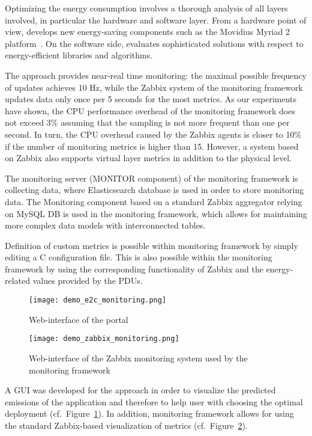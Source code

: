 \documentclass[10pt,letterpaper]{IEEEtran}
\begin{document}
Optimizing the energy consumption involves a thorough analysis of all layers involved, in particular the
hardware and software layer. From a hardware point of view, \EXCESS develops new energy-saving components
such as the Movidius Myriad 2 platform~\cite{movidius14}. On the software side, \EXCESS evaluates sophisticated solutions with respect to
energy-efficient libraries and algorithms. 

The \EXCESS approach provides near-real time monitoring: the maximal possible frequency of updates achieves 10 Hz,
while the Zabbix system of the \ECO monitoring framework updates data only once per 5 seconds for the most metrics.
As our experiments have shown, the CPU performance overhead of the \EXCESS monitoring framework does not
exceed 3\% assuming that the sampling is not more frequent than one per second.
In turn, the CPU overhead caused by the \ECO Zabbix agents is closer to 10\% if the number of monitoring metrics is
higher than 15. However, a system based on Zabbix also supports virtual layer metrics
in addition to the physical level. 

The monitoring server (MONITOR component) of the \EXCESS monitoring framework is collecting data,
where Elasticsearch database is used in order to store monitoring data.
The \ECO Monitoring component based on a standard Zabbix aggregator relying on
MySQL DB is used in the \ECO monitoring framework, which allows for maintaining more complex
data models with interconnected tables.

Definition of custom metrics is possible within \EXCESS monitoring framework by simply editing a C configuration file.
This is also possible within the \ECO monitoring framework by using the corresponding functionality of Zabbix
and the energy-related values provided by the PDUs.



\begin{figure}[t]
	\centering
	\texttt{[image: demo\_e2c\_monitoring.png]}
	\caption{Web-interface of the \ECO portal}
	\label{fig:demo_e2c_monitoring}
\end{figure}

\begin{figure}[t]
	\centering
	\texttt{[image: demo\_zabbix\_monitoring.png]}
	\caption{Web-interface of the Zabbix monitoring system used by the \ECO monitoring framework}
	\label{fig:demo_zabbix_monitoring}
\end{figure}

A GUI was developed for the \ECO approach in order to visualize the predicted 
emissions of the application and therefore to help user with choosing the optimal deployment
(cf.~Figure~\ref{fig:demo_e2c_monitoring}).
In addition, \ECO monitoring framework allows for using the standard Zabbix-based
visualization of metrics (cf.~Figure~\ref{fig:demo_zabbix_monitoring}).
\end{document}
